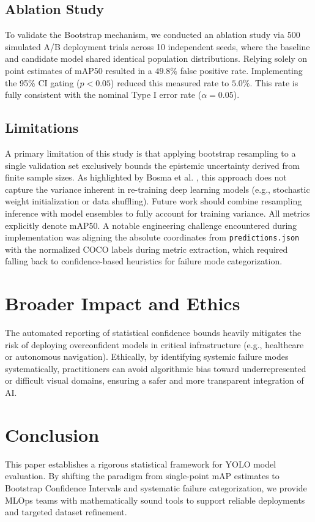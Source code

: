 \documentclass[conference]{IEEEtran}
\begin{document}
\subsection{Ablation Study}
To validate the Bootstrap mechanism, we conducted an ablation study via 500 simulated A/B deployment trials across 10 independent seeds, where the baseline and candidate model shared identical population distributions. Relying solely on point estimates of mAP50 resulted in a $49.8\%$ false positive rate. Implementing the 95\% CI gating ($p < 0.05$) reduced this measured rate to $5.0\%$. This rate is fully consistent with the nominal Type I error rate ($\alpha = 0.05$).

\subsection{Limitations}
A primary limitation of this study is that applying bootstrap resampling to a single validation set exclusively bounds the epistemic uncertainty derived from finite sample sizes. As highlighted by Bosma et al. \cite{bosma2024statistical}, this approach does not capture the variance inherent in re-training deep learning models (e.g., stochastic weight initialization or data shuffling). Future work should combine resampling inference with model ensembles to fully account for training variance. All metrics explicitly denote mAP50. A notable engineering challenge encountered during implementation was aligning the absolute coordinates from \texttt{predictions.json} with the normalized COCO labels during metric extraction, which required falling back to confidence-based heuristics for failure mode categorization.

\section{Broader Impact and Ethics}
The automated reporting of statistical confidence bounds heavily mitigates the risk of deploying overconfident models in critical infrastructure (e.g., healthcare or autonomous navigation). Ethically, by identifying systemic failure modes systematically, practitioners can avoid algorithmic bias toward underrepresented or difficult visual domains, ensuring a safer and more transparent integration of AI.

\section{Conclusion}
This paper establishes a rigorous statistical framework for YOLO model evaluation. By shifting the paradigm from single-point mAP estimates to Bootstrap Confidence Intervals and systematic failure categorization, we provide MLOps teams with mathematically sound tools to support reliable deployments and targeted dataset refinement.
\end{document}
